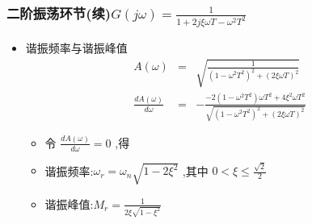 \documentclass[table]{beamer}
\begin{document}
\subsubsection{二阶振荡环节(续)\(G(j\omega) = \frac{1}{1+2j\xi\omega T-\omega^2 T^2}\)}
\label{sec:org65271dc}
\begin{itemize}
\item 谐振频率与谐振峰值
\begin{eqnarray*}
A(\omega) &=& \sqrt{\frac{1}{(1-\omega^2 T^2)^2+(2\xi\omega T)^2}}\\
\frac{dA(\omega)}{d\omega} &=& -\frac{-2(1-\omega^2 T^2)\omega T^2+4\xi^2\omega T^2}{\sqrt{(1-\omega^2 T^2)^2+(2\xi\omega T)^2}}
\end{eqnarray*}
\begin{itemize}
\item <2-> 令 \(\frac{dA(\omega)}{d\omega}=0\) ,得
\end{itemize}
\begin{itemize}
\item 谐振频率:\(\omega_r=\omega_n\sqrt{1-2\xi^2}\) ,其中 \(0<\xi\leq\frac{\sqrt{2}}{2}\)
\item 谐振峰值:\(M_r=\frac{1}{2\xi\sqrt{1-\xi^2}}\)
\end{itemize}
\end{itemize}
\end{document}

